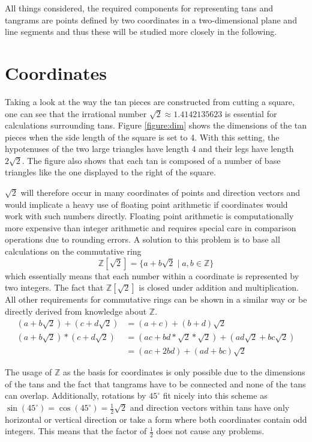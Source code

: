 All things considered, the required components for representing tans and tangrams are points defined by two coordinates in a two-dimensional plane and line segments and thus these will be studied more closely in the following.

\section{Coordinates}

Taking a look at the way the tan pieces are constructed from cutting a square, one can see that the irrational number $\sqrt{2} \approx 1.4142135623$ is essential for calculations surrounding tans. Figure \ref{figure:dim} shows the dimensions of the tan pieces when the side length of the square is set to 4. With this setting, the hypotenuses of the two large triangles have length 4 and their legs have length $2\sqrt{2}$. The figure also shows that each tan is composed of a number of base triangles like the one displayed to the right of the square. 


$\sqrt{2}$ will therefore occur in many coordinates of points and direction vectors and would implicate a heavy use of floating point arithmetic if coordinates would work with such numbers directly. Floating point arithmetic is computationally more expensive than integer arithmetic and requires special care in comparison operations due to rounding errors. A solution to this problem is to base all calculations on the commutative ring 
\[\mathbb{Z}[\sqrt{2}] = \{ a + b \sqrt{2} \;|  \; a,b \in \mathbb{Z}  \}\]
which essentially means that each number within a coordinate is represented by two integers. 
The fact that $\mathbb{Z}[\sqrt{2}]$ is closed under addition and multiplication. All other requirements for commutative rings can be shown in a similar way or be directly derived from knowledge about $\mathbb{Z}$.
\begin{align*}
(a + b \sqrt{2}) + (c + d \sqrt{2}) &= (a+c) + (b+d) \sqrt{2}\\
(a + b \sqrt{2}) * (c + d \sqrt{2}) &= (ac + bd*\sqrt{2}*\sqrt{2}) + (ad\sqrt{2} + bc\sqrt{2}) \\&= (ac + 2bd) + (ad+bc)\sqrt{2}
\end{align*}

The usage of $ \mathbb{Z}$ as the basis for coordinates is only possible due to the dimensions of the tans and the fact that tangrams have to be connected and none of the tans can overlap. Additionally, rotations by $45^\circ$ fit nicely into this scheme as $\sin(45^{\circ}) = \cos(45^{\circ})=  \frac{1}{2}\sqrt{2}$ and direction vectors within tans have only horizontal or vertical direction or take a form where both coordinates contain odd integers. This means that the factor of $\frac{1}{2}$ does not cause any problems. 
